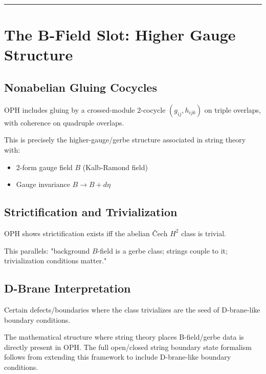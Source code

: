 \begin{center}\rule{0.5\linewidth}{0.5pt}\end{center}

\section{The B-Field Slot: Higher Gauge Structure}\label{7-the-b-field-slot-higher-gauge-structure}

\subsection{Nonabelian Gluing Cocycles}\label{71-nonabelian-gluing-cocycles}

OPH includes gluing by a crossed-module 2-cocycle \((g_{ij}, h_{ijk})\) on triple overlaps, with coherence on quadruple overlaps.

This is precisely the higher-gauge/gerbe structure associated in string theory with:

\begin{itemize}
\tightlist
\item
  2-form gauge field \(B\) (Kalb-Ramond field)
\item
  Gauge invariance \(B \to B + d\eta\)
\end{itemize}

\subsection{Strictification and Trivialization}\label{72-strictification-and-trivialization}

OPH shows strictification exists iff the abelian \v{C}ech \(H^2\) class is trivial.

This parallels: "background \(B\)-field is a gerbe class; strings couple to it; trivialization conditions matter."

\subsection{D-Brane Interpretation}\label{73-d-brane-interpretation}

Certain defects/boundaries where the class trivializes are the seed of D-brane-like boundary conditions.

The mathematical structure where string theory places B-field/gerbe data is directly present in OPH. The full open/closed string boundary state formalism follows from extending this framework to include D-brane-like boundary conditions.

